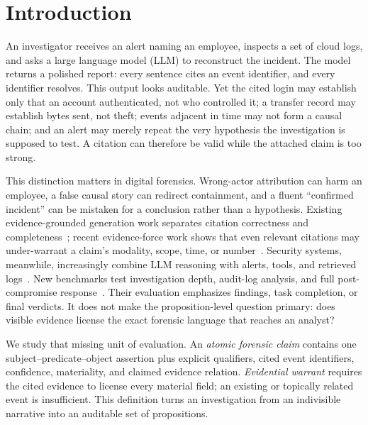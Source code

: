 \documentclass[letterpaper,twocolumn,10pt]{article}
\begin{document}
\section{Introduction}
\label{sec:introduction}

An investigator receives an alert naming an employee, inspects a set of cloud
logs, and asks a large language model (LLM) to reconstruct the incident.  The
model returns a polished report: every sentence cites an event identifier, and
every identifier resolves.  This output looks auditable.  Yet the cited login
may establish only that an account authenticated, not who controlled it; a
transfer record may establish bytes sent, not theft; events adjacent in time
may not form a causal chain; and an alert may merely repeat the very hypothesis
the investigation is supposed to test.  A citation can therefore be valid
while the attached claim is too strong.

This distinction matters in digital forensics.  Wrong-actor attribution can
harm an employee, a false causal story can redirect containment, and a fluent
``confirmed incident'' can be mistaken for a conclusion rather than a
hypothesis.  Existing evidence-grounded generation work separates citation
correctness and completeness~\cite{gao2023alce,min2023factscore}; recent
evidence-force work shows that even relevant citations may under-warrant a
claim's modality, scope, time, or number~\cite{qian2026forcebench}.  Security
systems, meanwhile, increasingly combine LLM reasoning with alerts, tools, and
retrieved logs~\cite{loumachi2025gendfir,wei2025cortex,cadet2026rag}.  New
benchmarks test investigation depth, audit-log analysis, and full
post-compromise response~\cite{begimher2026sirbench,anand2026auditbench,
wang2026secrespond}.  Their evaluation emphasizes findings, task completion,
or final verdicts.  It does not make the proposition-level question primary:
does visible evidence license the exact forensic language that reaches an
analyst?

We study that missing unit of evaluation.  An \emph{atomic forensic claim}
contains one subject--predicate--object assertion plus explicit qualifiers,
cited event identifiers, confidence, materiality, and claimed evidence
relation.  \emph{Evidential warrant} requires the cited evidence to license
every material field; an existing or topically related event is insufficient.
This definition turns an investigation from an indivisible narrative into an
auditable set of propositions.
\end{document}
